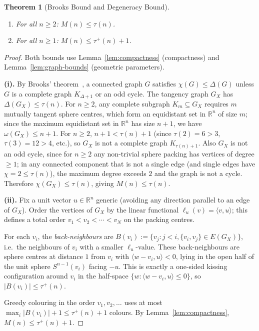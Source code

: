 \documentclass{article}
\newtheorem{theorem}{Theorem}[section]
\theoremstyle{definition}
\begin{document}
\begin{theorem}[Brooks Bound and Degeneracy Bound]\label{thm:further}
\begin{enumerate}
\item[\textup{(i)}] For all $n\ge 2$: $M(n)\le \tau(n)$.
\item[\textup{(ii)}] For all $n\ge 1$: $M(n)\le \tau^+(n)+1$.
\end{enumerate}
\end{theorem}

\begin{proof}
Both bounds use Lemma~\ref{lem:compactness} (compactness) and Lemma~\ref{lem:graph-bounds} (geometric parameters).

\textbf{(i).}  By Brooks' theorem~\cite{Brooks1941}, a connected graph $G$ satisfies $\chi(G)\le \Delta(G)$ unless $G$ is a complete graph $K_{\Delta+1}$ or an odd cycle.  The tangency graph $G_X$ has $\Delta(G_X)\le \tau(n)$.  For $n\ge 2$, any complete subgraph $K_m \subseteq G_X$ requires $m$ mutually tangent sphere centres, which form an equidistant set in $\mathbb{R}^n$ of size $m$; since the maximum equidistant set in $\mathbb{R}^n$ has size $n+1$, we have $\omega(G_X)\le n+1$.  For $n\ge 2$, $n+1 < \tau(n)+1$ (since $\tau(2)=6>3$, $\tau(3)=12>4$, etc.), so $G_X$ is not a complete graph $K_{\tau(n)+1}$.  Also $G_X$ is not an odd cycle, since for $n\ge 2$ any non-trivial sphere packing has vertices of degree $\ge 1$; in any connected component that is not a single edge (and single edges have $\chi=2\le\tau(n)$), the maximum degree exceeds $2$ and the graph is not a cycle.  Therefore $\chi(G_X)\le\tau(n)$, giving $M(n)\le\tau(n)$.

\textbf{(ii).}  Fix a unit vector $u\in\mathbb{R}^n$ generic (avoiding any direction parallel to an edge of $G_X$).  Order the vertices of $G_X$ by the linear functional $\ell_u(v)=\langle v,u\rangle$; this defines a total order $v_1<v_2<\cdots<v_N$ on the packing centres.

For each $v_i$, the \emph{back-neighbours} are $B(v_i):=\{v_j: j<i,\{v_i,v_j\}\in E(G_X)\}$, i.e.\ the neighbours of $v_i$ with a smaller $\ell_u$-value.  These back-neighbours are sphere centres at distance $1$ from $v_i$ with $\langle w-v_i,u\rangle<0$, lying in the open half of the unit sphere $S^{n-1}(v_i)$ facing $-u$.  This is exactly a one-sided kissing configuration around $v_i$ in the half-space $\{w:\langle w-v_i,u\rangle\le 0\}$, so $|B(v_i)|\le\tau^+(n)$.

Greedy colouring in the order $v_1,v_2,\ldots$ uses at most $\max_i|B(v_i)|+1\le\tau^+(n)+1$ colours.  By Lemma~\ref{lem:compactness}, $M(n)\le\tau^+(n)+1$.
\end{proof}
\end{document}
